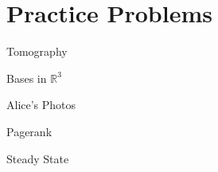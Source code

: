 \section{Practice Problems}

\begin{frame}{Tomography}

\end{frame}

\begin{frame}{Bases in $\mathbb{R}^3$}

\end{frame}

\begin{frame}{Alice's Photos}

\end{frame}

\begin{frame}{Pagerank}

\end{frame}

\begin{frame}{Steady State}

\end{frame}
